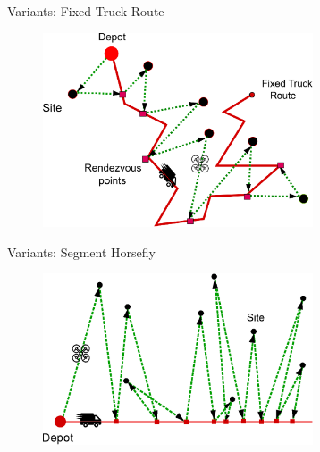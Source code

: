 \documentclass{beamer}
\begin{document}

\begin{frame}{Variants: Fixed Truck Route}
\begin{figure}
    \centering
        \includegraphics[width=8.0cm]{slide_imgs/fixed_truck_route_variant.eps}
  \end{figure}

\end{frame}


\begin{frame}{Variants: Segment Horsefly}
\begin{figure}
    \centering
        \includegraphics[width=8.0cm]{slide_imgs/segment_horsefly.eps}
  \end{figure}

\end{frame}

\end{document}
